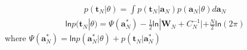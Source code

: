 \documentclass[a4paper]{article}
\begin{document}
\begin{align}
p(\mathbf{t}_N |\theta) = \int p(\mathbf{t}_N|\mathbf{a}_N) p(\mathbf{a}_N |\theta)  d\mathbf{a}_N
\end{align}
\begin{align}
\mathsf{ln}p(\mathbf{t}_N |\theta) = \Psi(\mathbf{a}_N^*) -
  \frac{1}{2}\mathsf{ln}|\mathbf{W}_N+C_N^{-1}| + \frac{N}{2} \mathsf{ln}(2\pi)
\end{align}
where $\Psi(\mathbf{a}_N^*) = \mathsf{ln} p(\mathbf{a}_N^* |\theta) + p(\mathbf{t}_N |\mathbf{a}_N^*)$
\end{document}
